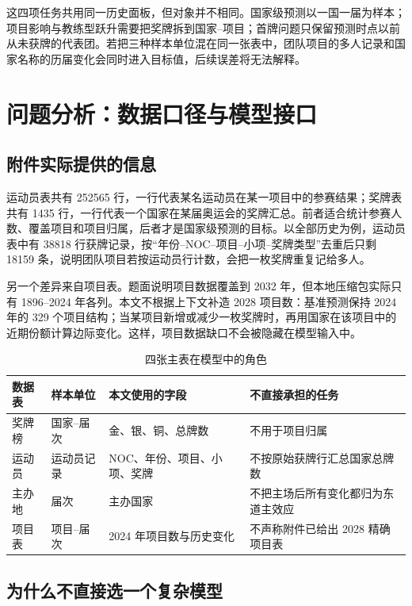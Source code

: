 \documentclass[UTF8,11pt,a4paper]{ctexart}
\begin{document}
这四项任务共用同一历史面板，但对象并不相同。国家级预测以一国一届为样本；项目影响与教练型跃升需要把奖牌拆到国家--项目；首牌问题只保留预测时点以前从未获牌的代表团。若把三种样本单位混在同一张表中，团队项目的多人记录和国家名称的历届变化会同时进入目标值，后续误差将无法解释。

\section{问题分析：数据口径与模型接口}

\subsection{附件实际提供的信息}

运动员表共有 252565 行，一行代表某名运动员在某一项目中的参赛结果；奖牌表共有 1435 行，一行代表一个国家在某届奥运会的奖牌汇总。前者适合统计参赛人数、覆盖项目和项目归属，后者才是国家级预测的目标。以全部历史为例，运动员表中有 38818 行获牌记录，按“年份--NOC--项目--小项--奖牌类型”去重后只剩 18159 条，说明团队项目若按运动员行计数，会把一枚奖牌重复记给多人。

另一个差异来自项目表。题面说明项目数据覆盖到 2032 年，但本地压缩包实际只有 1896--2024 年各列。本文不根据上下文补造 2028 项目数：基准预测保持 2024 年的 329 个项目结构；当某项目新增或减少一枚奖牌时，再用国家在该项目中的近期份额计算边际变化。这样，项目数据缺口不会被隐藏在模型输入中。

\begin{table}[H]
\centering
\caption{四张主表在模型中的角色}
\label{tab:data-role}
\begin{tabularx}{\textwidth}{p{3.2cm}p{2.0cm}X X}
\toprule
数据表 & 样本单位 & 本文使用的字段 & 不直接承担的任务\\
\midrule
奖牌榜 & 国家--届次 & 金、银、铜、总牌数 & 不用于项目归属\\
运动员 & 运动员记录 & NOC、年份、项目、小项、奖牌 & 不按原始获牌行汇总国家总牌数\\
主办地 & 届次 & 主办国家 & 不把主场后所有变化都归为东道主效应\\
项目表 & 项目--届次 & 2024 年项目数与历史变化 & 不声称附件已给出 2028 精确项目表\\
\bottomrule
\end{tabularx}
\end{table}

\subsection{为什么不直接选一个复杂模型}
\end{document}

